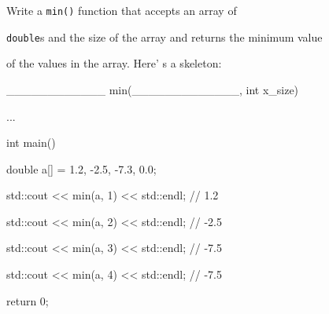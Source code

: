 Write a \texttt{min()} function that accepts an array of

\texttt{double}s and the size of the array and returns the minimum value

of the values in the array. Here' s a skeleton:



\begin{consolethree}[escapeinside=||]

\_\_\_\_\_\_\_\_\_\_\_\_ min(\_\_\_\_\_\_\_\_\_\_\_\_\_, int x\_size)

{

    ...

}



int main()

{

    double a[] = {1.2, -2.5, -7.3, 0.0};

    std::cout << min(a, 1) << std::endl; // 1.2

    std::cout << min(a, 2) << std::endl; // -2.5

    std::cout << min(a, 3) << std::endl; // -7.5

    std::cout << min(a, 4) << std::endl; // -7.5

    return 0;

}

\end{consolethree}

